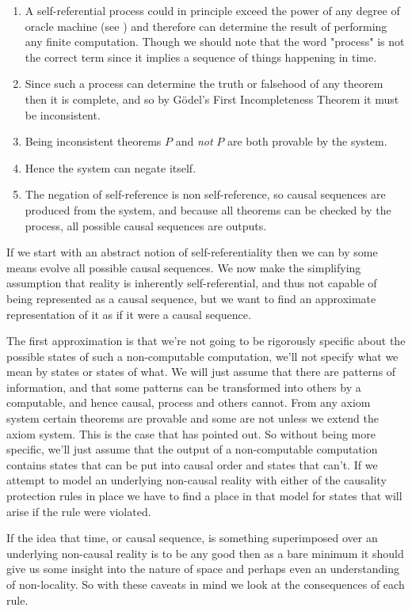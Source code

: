 \documentclass[
   ,final            %
  ]
  {aipproc}
\begin{document}
\begin{enumerate}[(1)]
\item
A self-referential process could in principle exceed the power of any degree of oracle machine (see \citep[chap. 7.8]{Penrose_SOM}) and
therefore can determine the result of performing any finite computation. Though we should note that the word "process" is not the correct term since %
it implies a sequence of things happening in time. 
\item
Since such a process can determine the truth or falsehood of any theorem then it is complete, and so by 
Gödel's First Incompleteness Theorem \cite{Godel} it must be inconsistent.
\item
Being inconsistent theorems $P$ and \emph{not} $P$ are both provable by the system.
\item
Hence the system can negate itself.
\item
The negation of self-reference is non self-reference, so causal sequences are produced from the system, and because all theorems can be checked by the
process, all possible causal sequences are outputs. 
\end{enumerate}
\par If we start with an abstract notion of self-referentiality then we can by some means evolve all possible causal sequences. We now make the
simplifying assumption that reality is inherently self-referential, and thus not capable of being represented as a causal sequence, but we want to %
find an approximate representation of it as if it were a causal sequence. 
\par
The first approximation is that we're not going to be rigorously specific about the possible states of such a non-computable computation, we'll not %
specify what we mean by states or states of what. We will just assume that there are patterns
of information, and that some patterns can be transformed into others by a computable, and hence causal,
process and others cannot. From any axiom system certain theorems are provable and some are not unless
we extend the axiom system. This is the case that \citet{Chaitin_Randomness_in_Arithmetic} has pointed out. So without being more
specific, we'll just assume that the output of a non-computable computation contains states that can be
put into causal order and states that can't. If we attempt to model an underlying non-causal reality with
either of the causality protection rules in place we have to find a place in that model for states that will
arise if the rule were violated. 
\par
If the idea that time, or causal sequence, is something superimposed over
an underlying non-causal reality is to be any good then as a bare minimum it should give us some insight
into the nature of space and perhaps even an understanding of non-locality. So with these caveats in mind
we look at the consequences of each rule.
\end{document}
